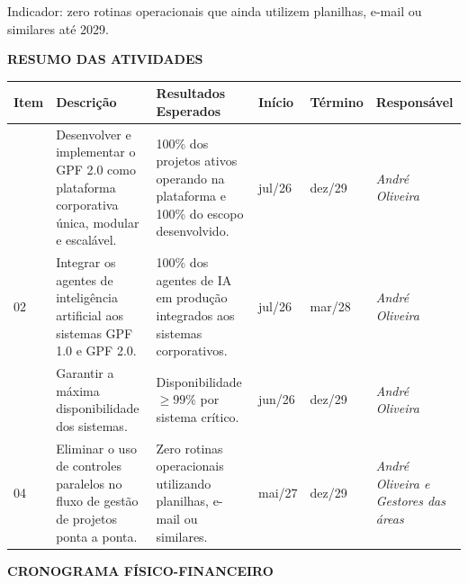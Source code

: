\documentclass[12pt,a4paper]{article}
\newcommand{\secao}[1]{%
  \par\vspace{6pt}%
  {\noindent\bfseries\color{azulTitulo}\fontsize{13}{16}\selectfont #1}%
  \par\vspace{2pt}%
}
\begin{document}
Indicador: zero rotinas operacionais que ainda utilizem planilhas, e-mail ou similares até 2029.

\secao{RESUMO DAS ATIVIDADES}

\begingroup
\footnotesize
{}
\renewcommand{\arraystretch}{1.3}
\setlength{\tabcolsep}{4pt}
\begin{tabular}{|>{\centering\arraybackslash}p{}|p{}|p{}|>{\centering\arraybackslash}p{}|>{\centering\arraybackslash}p{}|>{\centering\arraybackslash}p{}|}
\hline
\cellcolor{azulCabecalho}\bfseries Item &
\cellcolor{azulCabecalho}\centering\arraybackslash\bfseries Descrição &
\cellcolor{azulCabecalho}\centering\arraybackslash\bfseries Resultados Esperados &
\cellcolor{azulCabecalho}\bfseries Início &
\cellcolor{azulCabecalho}\bfseries Término &
\cellcolor{azulCabecalho}\bfseries Responsável \\
\hline
01 & Desenvolver e implementar o GPF 2.0 como plataforma corporativa única, modular e escalável. & 100\% dos projetos ativos operando na plataforma e 100\% do escopo desenvolvido. & jul/26 & dez/29 & \itshape André Oliveira \\
\hline
\cellcolor{cinzaClaro}02 & \cellcolor{cinzaClaro}Integrar os agentes de inteligência artificial aos sistemas GPF 1.0 e GPF 2.0. & \cellcolor{cinzaClaro}100\% dos agentes de IA em produção integrados aos sistemas corporativos. & \cellcolor{cinzaClaro}jul/26 & \cellcolor{cinzaClaro}mar/28 & \cellcolor{cinzaClaro}\itshape André Oliveira \\
\hline
03 & Garantir a máxima disponibilidade dos sistemas. & Disponibilidade $\geq 99\%$ por sistema crítico. & jun/26 & dez/29 & \itshape André Oliveira \\
\hline
\cellcolor{cinzaClaro}04 & \cellcolor{cinzaClaro}Eliminar o uso de controles paralelos no fluxo de gestão de projetos ponta a ponta. & \cellcolor{cinzaClaro}Zero rotinas operacionais utilizando planilhas, e-mail ou similares. & \cellcolor{cinzaClaro}mai/27 & \cellcolor{cinzaClaro}dez/29 & \cellcolor{cinzaClaro}\itshape André Oliveira e Gestores das áreas \\
\hline
\end{tabular}
\endgroup

\secao{CRONOGRAMA FÍSICO-FINANCEIRO}
\end{document}

